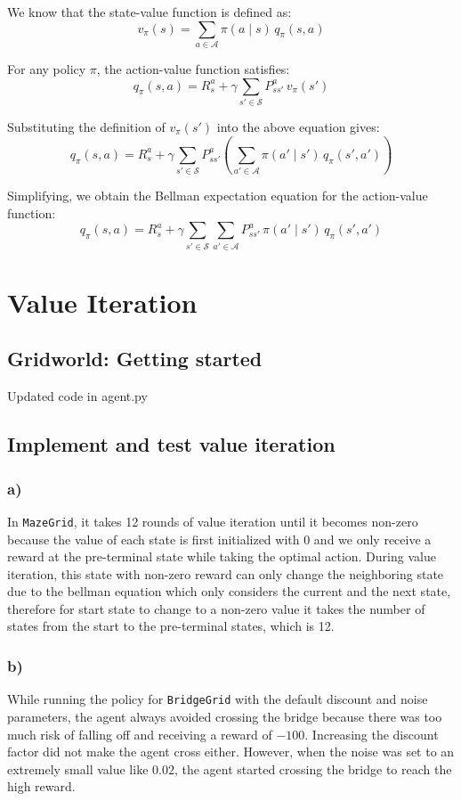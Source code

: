 \documentclass[11pt]{article}
\begin{document}
We know that the state-value function is defined as:
\[
v_{\pi}(s) = \sum_{a \in \mathcal{A}} \pi(a \mid s) \, q_{\pi}(s,a)
\]

For any policy $\pi$, the action-value function satisfies:
\[
q_{\pi}(s,a)
= R_s^a + \gamma \sum_{s' \in \mathcal{S}} P_{ss'}^a \, v_{\pi}(s')
\]

Substituting the definition of $v_{\pi}(s')$ into the above equation gives:
\[
q_{\pi}(s,a)
= R_s^a + \gamma \sum_{s' \in \mathcal{S}} P_{ss'}^a 
   \left( \sum_{a' \in \mathcal{A}} \pi(a' \mid s') \, q_{\pi}(s',a') \right)
\]

Simplifying, we obtain the Bellman expectation equation for the action-value function:
\[
\boxed{
q_{\pi}(s,a)
= R_s^a + \gamma \sum_{s' \in \mathcal{S}} \sum_{a' \in \mathcal{A}} 
      P_{ss'}^a \, \pi(a' \mid s') \, q_{\pi}(s',a')
}
\]

\section{Value Iteration}
\subsection{Gridworld: Getting started}

Updated code in agent.py

\subsection{Implement and test value iteration}
\subsubsection*{a)} In \texttt{MazeGrid}, it takes 12 rounds of value iteration until it becomes non-zero because the value of each state is first initialized with 0 and we only receive a reward at the pre-terminal state while taking the optimal action. During value iteration, this state with non-zero reward can only change the neighboring state due to the bellman equation which only considers the current and the next state, therefore for start state to change to a non-zero value it takes the number of states from the start to the pre-terminal states, which is 12.

\subsubsection*{b)} While running the policy for \texttt{BridgeGrid} with the default discount and noise parameters, the agent always avoided crossing the bridge because there was too much risk of falling off and receiving a reward of $-100$. Increasing the discount factor did not make the agent cross either. However, when the noise was set to an extremely small value like  $0.02$, the agent started crossing the bridge to reach the high reward. 
\end{document}

